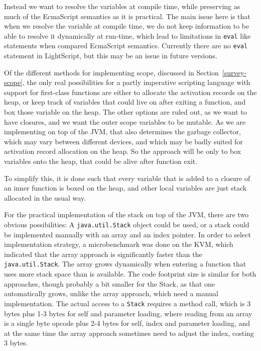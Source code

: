 \documentclass[11pt]{report}
\begin{document}
Instead we want to resolve the variables at compile time, while preserving as much of the EcmaScript semantics as it is practical. The main issue here is that when we resolve the variable at compile time, we do not keep information to be able to resolve it dynamically at run-time,
which lead to limitations in \verb|eval| like statements when compared EcmaScript semantics. Currently there are no \verb|eval| statement in LightScript, but this may be an issue in future versions.

Of the different methods for implementing scope, discussed in Section~\ref{survey-scope}, the only real possibilities for a partly imperative scripting language with support for first-class functions are either to allocate the activation records on the heap, or keep track of variables that could live on after exiting a function, and box those variable on the heap.
The other options are ruled out, as we want to have closures, and we want the outer scope variables to be mutable.
As we are implementing on top of the JVM, that also determines the garbage collector, which may vary between different devices, and which may be badly suited for activation record allocation on the heap.
So the approach will be only to box variables onto the heap, that could be alive after function exit.

To simplify this, it is done such that every variable that is added to a closure of an inner function is boxed on the heap, and other local variables are just stack allocated in the usual way. 

For the practical implementation of the stack on top of the JVM, there are two obvious possibilities: A \verb|java.util.Stack| object could be used, or a stack could be implemented manually with an array and an index pointer. 
In order to select implementation strategy, a microbenchmark was done on the KVM, which indicated that the array approach is significantly faster than the \verb|java.util.Stack|. The array grows dynamically when entering a function that uses more stack space than is available. 
The code footprint size is similar for both approaches, though probably a bit smaller for the Stack, as that one automatically grows, unlike the array approach, which need a manual implementation.
The actual access to a \verb|Stack| requires a method call, which is 3 bytes plus 1-3 bytes for self and parameter loading, where reading from an array is a single byte opcode plus 2-4 bytes for self, index and parameter loading, and at the same time the array approach sometimes need to adjust the index, costing 3 bytes.
\end{document}

